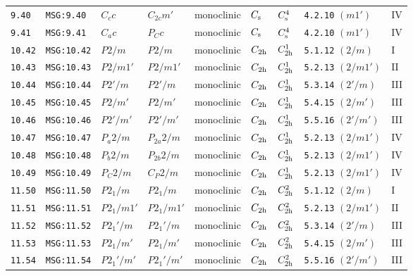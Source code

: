 \documentclass[fleqn,10pt]{jsarticle}
\begin{document}
\begin{center}
\begin{longtable}{lllllllll}
\texttt{9.40} & \texttt{MSG:9.40} & $C_{c}c$ & $C_{2c}m'$ & monoclinic & $C_{\rm s}$ & $C_{\rm s}^{4}$ & \texttt{4.2.10} $(m1')$ & IV \\
\texttt{9.41} & \texttt{MSG:9.41} & $C_{a}c$ & $P_{C}c$ & monoclinic & $C_{\rm s}$ & $C_{\rm s}^{4}$ & \texttt{4.2.10} $(m1')$ & IV \\ \hline
\texttt{10.42} & \texttt{MSG:10.42} & $P2/m$ & $P2/m$ & monoclinic & $C_{\rm 2h}$ & $C_{\rm 2h}^{1}$ & \texttt{5.1.12} $(2/m)$ & I \\
\texttt{10.43} & \texttt{MSG:10.43} & $P2/m1'$ & $P2/m1'$ & monoclinic & $C_{\rm 2h}$ & $C_{\rm 2h}^{1}$ & \texttt{5.2.13} $(2/m1')$ & II \\
\texttt{10.44} & \texttt{MSG:10.44} & $P2'/m$ & $P2'/m$ & monoclinic & $C_{\rm 2h}$ & $C_{\rm 2h}^{1}$ & \texttt{5.3.14} $(2'/m)$ & III \\
\texttt{10.45} & \texttt{MSG:10.45} & $P2/m'$ & $P2/m'$ & monoclinic & $C_{\rm 2h}$ & $C_{\rm 2h}^{1}$ & \texttt{5.4.15} $(2/m')$ & III \\
\texttt{10.46} & \texttt{MSG:10.46} & $P2'/m'$ & $P2'/m'$ & monoclinic & $C_{\rm 2h}$ & $C_{\rm 2h}^{1}$ & \texttt{5.5.16} $(2'/m')$ & III \\
\texttt{10.47} & \texttt{MSG:10.47} & $P_{a}2/m$ & $P_{2a}2/m$ & monoclinic & $C_{\rm 2h}$ & $C_{\rm 2h}^{1}$ & \texttt{5.2.13} $(2/m1')$ & IV \\
\texttt{10.48} & \texttt{MSG:10.48} & $P_{b}2/m$ & $P_{2b}2/m$ & monoclinic & $C_{\rm 2h}$ & $C_{\rm 2h}^{1}$ & \texttt{5.2.13} $(2/m1')$ & IV \\
\texttt{10.49} & \texttt{MSG:10.49} & $P_{C}2/m$ & $C_{P}2/m$ & monoclinic & $C_{\rm 2h}$ & $C_{\rm 2h}^{1}$ & \texttt{5.2.13} $(2/m1')$ & IV \\ \hline
\texttt{11.50} & \texttt{MSG:11.50} & $P2_{1}/m$ & $P2_{1}/m$ & monoclinic & $C_{\rm 2h}$ & $C_{\rm 2h}^{2}$ & \texttt{5.1.12} $(2/m)$ & I \\
\texttt{11.51} & \texttt{MSG:11.51} & $P2_{1}/m1'$ & $P2_{1}/m1'$ & monoclinic & $C_{\rm 2h}$ & $C_{\rm 2h}^{2}$ & \texttt{5.2.13} $(2/m1')$ & II \\
\texttt{11.52} & \texttt{MSG:11.52} & $P2_{1}'/m$ & $P2_{1}'/m$ & monoclinic & $C_{\rm 2h}$ & $C_{\rm 2h}^{2}$ & \texttt{5.3.14} $(2'/m)$ & III \\
\texttt{11.53} & \texttt{MSG:11.53} & $P2_{1}/m'$ & $P2_{1}/m'$ & monoclinic & $C_{\rm 2h}$ & $C_{\rm 2h}^{2}$ & \texttt{5.4.15} $(2/m')$ & III \\
\texttt{11.54} & \texttt{MSG:11.54} & $P2_{1}'/m'$ & $P2_{1}'/m'$ & monoclinic & $C_{\rm 2h}$ & $C_{\rm 2h}^{2}$ & \texttt{5.5.16} $(2'/m')$ & III \\

\end{longtable}
\end{center}
\end{document}
